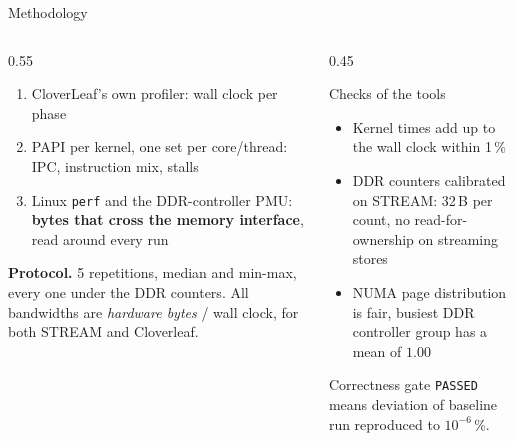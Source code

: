 \documentclass[aspectratio=169,10pt]{beamer}
\begin{document}
\begin{frame}{Methodology}
  \begin{columns}[T]
    \begin{column}{0.55\textwidth}
      \begin{enumerate}
        \item CloverLeaf's own profiler: wall clock per phase
        \item PAPI per kernel, one set per core/thread: IPC, instruction mix, stalls
        \item Linux \texttt{perf} and the DDR-controller PMU: \textbf{bytes that cross the memory interface}, read around every run
      \end{enumerate}
      \vspace{0.3cm}
      \textbf{Protocol.} 5 repetitions, median and min-max, every one under the DDR counters. All bandwidths are \emph{hardware bytes} / wall clock, for both STREAM and Cloverleaf.
    \end{column}
    \begin{column}{0.45\textwidth}
      \begin{block}{Checks of the tools}
        \begin{itemize}
          \item Kernel times add up to the wall clock within 1\,\%
          \item DDR counters calibrated on STREAM: 32\,B per count, no read-for-ownership on streaming stores
          \item NUMA page distribution is fair, busiest DDR controller group has a mean of $1.00$
        \end{itemize}
      \end{block}
      \begin{block}{Correctness gate}
        \texttt{PASSED} means deviation of baseline run reproduced to $10^{-6}$\,\%.
      \end{block}
    \end{column}
  \end{columns}
\end{frame}


\end{document}
